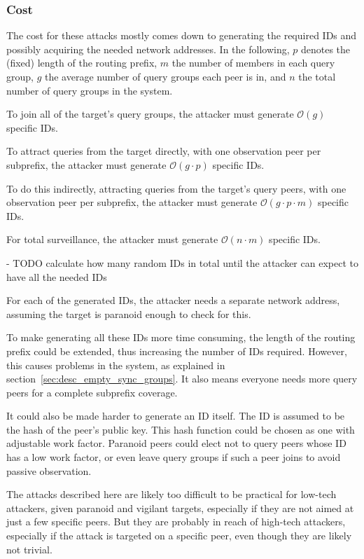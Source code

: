 \subsubsection{Cost}
The cost for these attacks mostly comes down to generating the required IDs and
possibly acquiring the needed network addresses. In the following, $p$ denotes
the (fixed) length of the routing prefix, $m$ the number of members in each
query group, $g$ the average number of query groups each peer is in, and $n$ the
total number of query groups in the system.

To join all of the target's query groups, the attacker must generate
$\mathcal{O}(g)$ specific IDs.

To attract queries from the target directly, with one observation peer per
subprefix, the attacker must generate $\mathcal{O}(g \cdot p)$ specific IDs.

To do this indirectly, attracting queries from the target's query peers, with
one observation peer per subprefix, the attacker must generate $\mathcal{O}(g
\cdot p \cdot m)$ specific IDs.

For total surveillance, the attacker must generate $\mathcal{O}(n \cdot m)$
specific IDs.

- TODO calculate how many random IDs in total until the attacker can expect to
  have all the needed IDs

For each of the generated IDs, the attacker needs a separate network address,
assuming the target is paranoid enough to check for this.

To make generating all these IDs more time consuming, the length of the routing
prefix could be extended, thus increasing the number of IDs required. However,
this causes problems in the system, as explained in
section~\ref{sec:desc_empty_sync_groups}. It also means everyone needs more
query peers for a complete subprefix coverage.

It could also be made harder to generate an ID itself. The ID is assumed to be
the hash of the peer's public key. This hash function could be chosen as one
with adjustable work factor. Paranoid peers could elect not to query peers whose
ID has a low work factor, or even leave query groups if such a peer joins to
avoid passive observation.

The attacks described here are likely too difficult to be practical for low-tech
attackers, given paranoid and vigilant targets, especially if they are not aimed
at just a few specific peers. But they are probably in reach of high-tech
attackers, especially if the attack is targeted on a specific peer, even though
they are likely not trivial.
